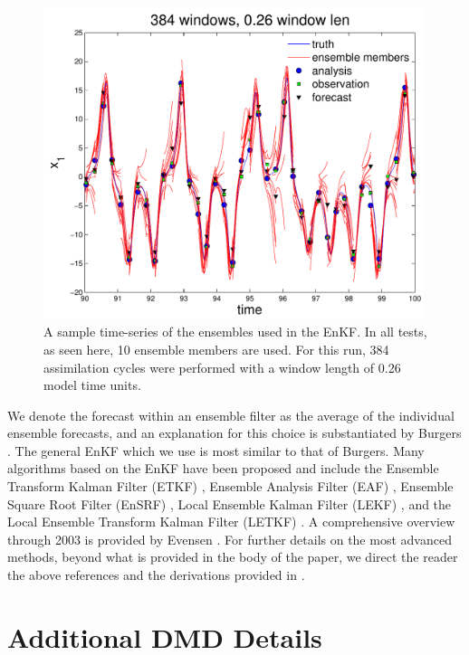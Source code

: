 \begin{figure}[h!]
  \centering
  \includegraphics[width=0.99\textwidth]{figures/EnKF_spaghetti.pdf}
  \caption[A sample time-series of the ensembles used in the EnKF]{
    A sample time-series of the ensembles used in the EnKF.
    In all tests, as seen here, 10 ensemble members are used.
    For this run, 384 assimilation cycles were performed with a window length of 0.26 model time units.
  }
  \label{fig:spaghetti}
\end{figure}

We denote the forecast within an ensemble filter as the average of the individual ensemble forecasts, and an explanation for this choice is substantiated by Burgers \cite{burgers1998analysis}.
The general EnKF which we use is most similar to that of Burgers.
Many algorithms based on the EnKF have been proposed and include the Ensemble Transform Kalman Filter (ETKF) \cite{ott2004local}, Ensemble Analysis Filter (EAF) \cite{anderson2001new}, Ensemble Square Root Filter (EnSRF) \cite{tippett2003ensemble}, Local Ensemble Kalman Filter (LEKF) \cite{ott2004local}, and the Local Ensemble Transform Kalman Filter (LETKF) \cite{hunt2007efficient}.
A comprehensive overview through 2003 is provided by Evensen \cite{evensen2003ensemble}.
For further details on the most advanced methods, beyond what is provided in the body of the paper, we direct the reader the above references and the derivations provided in \cite{reagan2013}.

\clearpage
\pagebreak
\section{Additional DMD Details}

